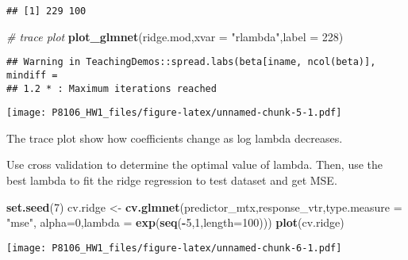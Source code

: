 \documentclass[]{article}
\newenvironment{Shaded}{\begin{snugshade}}{\end{snugshade}}
\newcommand{\CommentTok}[1]{\textcolor[rgb]{0.56,0.35,0.01}{\textit{#1}}}
\newcommand{\DataTypeTok}[1]{\textcolor[rgb]{0.13,0.29,0.53}{#1}}
\newcommand{\DecValTok}[1]{\textcolor[rgb]{0.00,0.00,0.81}{#1}}
\newcommand{\FloatTok}[1]{\textcolor[rgb]{0.00,0.00,0.81}{#1}}
\newcommand{\KeywordTok}[1]{\textcolor[rgb]{0.13,0.29,0.53}{\textbf{#1}}}
\newcommand{\NormalTok}[1]{#1}
\newcommand{\OperatorTok}[1]{\textcolor[rgb]{0.81,0.36,0.00}{\textbf{#1}}}
\newcommand{\StringTok}[1]{\textcolor[rgb]{0.31,0.60,0.02}{#1}}
\begin{document}
\begin{verbatim}
## [1] 229 100
\end{verbatim}

\begin{Shaded}
\begin{Highlighting}[]
\CommentTok{# trace plot}
\KeywordTok{plot_glmnet}\NormalTok{(ridge.mod,}\DataTypeTok{xvar =} \StringTok{"rlambda"}\NormalTok{,}\DataTypeTok{label =} \DecValTok{228}\NormalTok{)}
\end{Highlighting}
\end{Shaded}

\begin{verbatim}
## Warning in TeachingDemos::spread.labs(beta[iname, ncol(beta)], mindiff =
## 1.2 * : Maximum iterations reached
\end{verbatim}

\texttt{[image: P8106\_HW1\_files/figure-latex/unnamed-chunk-5-1.pdf]}

The trace plot show how coefficients change as log lambda decreases.

Use cross validation to determine the optimal value of lambda. Then, use
the best lambda to fit the ridge regression to test dataset and get MSE.

\begin{Shaded}
\begin{Highlighting}[]
\KeywordTok{set.seed}\NormalTok{(}\DecValTok{7}\NormalTok{)}
\NormalTok{cv.ridge <-}\StringTok{ }\KeywordTok{cv.glmnet}\NormalTok{(predictor_mtx,response_vtr,}\DataTypeTok{type.measure =} \StringTok{"mse"}\NormalTok{,}
                      \DataTypeTok{alpha=}\DecValTok{0}\NormalTok{,}\DataTypeTok{lambda =} \KeywordTok{exp}\NormalTok{(}\KeywordTok{seq}\NormalTok{(}\OperatorTok{-}\DecValTok{5}\NormalTok{,}\DecValTok{1}\NormalTok{,}\DataTypeTok{length=}\DecValTok{100}\NormalTok{)))}
\KeywordTok{plot}\NormalTok{(cv.ridge)}
\end{Highlighting}
\end{Shaded}

\texttt{[image: P8106\_HW1\_files/figure-latex/unnamed-chunk-6-1.pdf]}

\begin{Shaded}
\end{Shaded}
\end{document}
